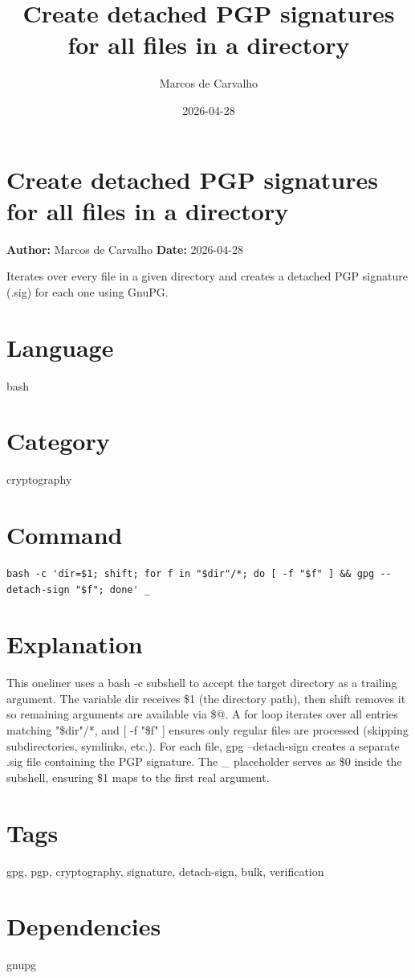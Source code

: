 \documentclass{article}
\title{Create detached PGP signatures for all files in a directory}
\author{Marcos de Carvalho}
\date{2026-04-28}
\begin{document}
\section*{Create detached PGP signatures for all files in a directory}
\textbf{Author:} Marcos de Carvalho \hfill \textbf{Date:} 2026-04-28

\noindent Iterates over every file in a given directory and creates a detached PGP signature (.sig) for each one using GnuPG.

\section*{Language}
bash

\section*{Category}
cryptography

\section*{Command}
\begin{lstlisting}
bash -c 'dir=$1; shift; for f in "$dir"/*; do [ -f "$f" ] && gpg --detach-sign "$f"; done' _
\end{lstlisting}

\section*{Explanation}
This oneliner uses a bash -c subshell to accept the target directory as a trailing argument. The variable dir receives \$1 (the directory path), then shift removes it so remaining arguments are available via \$@. A for loop iterates over all entries matching "\$dir"/*, and [ -f "\$f" ] ensures only regular files are processed (skipping subdirectories, symlinks, etc.). For each file, gpg --detach-sign creates a separate .sig file containing the PGP signature. The \_ placeholder serves as \$0 inside the subshell, ensuring \$1 maps to the first real argument.

\section*{Tags}
gpg, pgp, cryptography, signature, detach-sign, bulk, verification

\section*{Dependencies}
gnupg
\end{document}
